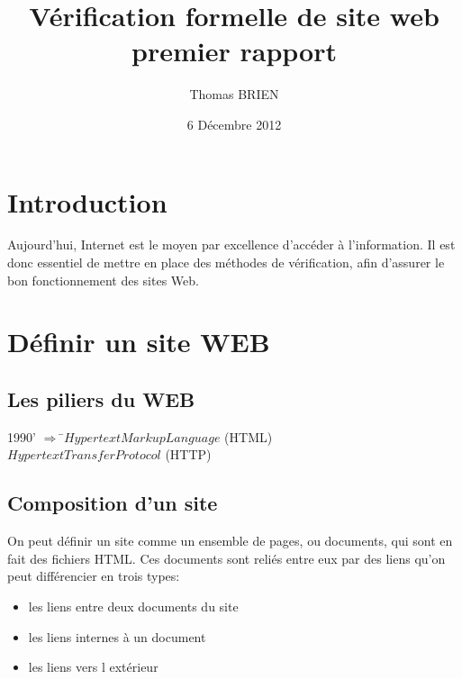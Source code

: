 \documentclass[a4paper]{report}
\title{Vérification formelle de site web\\premier rapport}
\author{Thomas BRIEN}
\date{6 Décembre 2012}
\begin{document}
\maketitle
\tableofcontents



\chapter*{Introduction}
Aujourd'hui, Internet est le moyen par excellence d'accéder à l'information. 
Il est donc essentiel de mettre en place des méthodes de vérification, afin d'assurer le bon fonctionnement des sites Web.\\



\chapter*{Définir un site WEB}
\section*{Les piliers du WEB\\}
\begin{tabbing}
1990' $ \Rightarrow$ \=$Hypertext Markup Language$ (HTML)\\
       \>$Hypertext Transfer Protocol$ (HTTP)\\
\end{tabbing}

\section*{Composition d'un site\\}
On peut définir un site comme un ensemble de pages, ou documents, qui sont en fait des fichiers HTML. Ces documents sont reliés entre eux par des liens qu'on peut différencier en trois types:\\
\begin{itemize}
\item les liens entre deux documents du site
\item les liens internes à un document
\item les liens vers l extérieur
\end{itemize}
\end{document}

